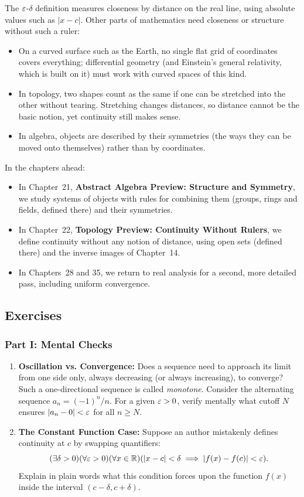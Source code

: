 The $\varepsilon$-$\delta$ definition measures closeness by distance on the real line, using absolute values such as $|x - c|$. Other parts of mathematics need closeness or structure without such a ruler:
\begin{itemize}
\item On a curved surface such as the Earth, no single flat grid of coordinates covers everything; differential geometry (and Einstein's general relativity, which is built on it) must work with curved spaces of this kind.
\item In topology, two shapes count as the same if one can be stretched into the other without tearing. Stretching changes distances, so distance cannot be the basic notion, yet continuity still makes sense.
\item In algebra, objects are described by their symmetries (the ways they can be moved onto themselves) rather than by coordinates.
\end{itemize}

In the chapters ahead:
\begin{itemize}
\item In Chapter~21, \textbf{Abstract Algebra Preview: Structure and Symmetry}, we study systems of objects with rules for combining them (groups, rings and fields, defined there) and their symmetries.
\item In Chapter~22, \textbf{Topology Preview: Continuity Without Rulers}, we define continuity without any notion of distance, using open sets (defined there) and the inverse images of Chapter~14.
\item In Chapters~28 and 35, we return to real analysis for a second, more detailed pass, including uniform convergence.
\end{itemize}

\subsection{Exercises}

\subsubsection*{Part I: Mental Checks}

\begin{enumerate}
\item \textbf{Oscillation vs. Convergence:} Does a sequence need to approach its limit from one side only, always decreasing (or always increasing), to converge? Such a one-directional sequence is called \emph{monotone}. Consider the alternating sequence $a_n = (-1)^n/n$. For a given $\varepsilon > 0$, verify mentally what cutoff $N$ ensures $|a_n - 0| < \varepsilon$ for all $n \ge N$.
\item \textbf{The Constant Function Case:} Suppose an author mistakenly defines continuity at $c$ by swapping quantifiers:
\[
(\exists \delta > 0)(\forall \varepsilon > 0)(\forall x \in \mathbb{R})(|x - c| < \delta \implies |f(x) - f(c)| < \varepsilon).
\]
Explain in plain words what this condition forces upon the function $f(x)$ inside the interval $(c - \delta, c + \delta)$.
\end{enumerate}

